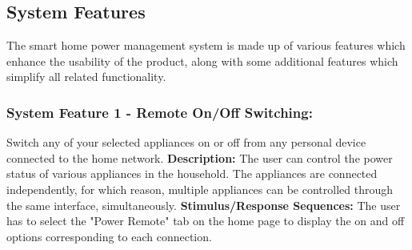 \documentclass[10pt,twocolumn]{witseiepaper}
\begin{document}
	\subsection{System Features}
	The smart home power management system is made up of various features which enhance the usability of the product, along with some additional features which simplify all related functionality.
	\subsubsection{System Feature 1 - Remote On/Off Switching: } 
	Switch any of your selected appliances on or off from any personal device connected to the home network. 
	\newline
	\textbf{Description:}
	The user can control the power status of various appliances in the household. The appliances are connected independently, for which reason, multiple appliances can be controlled through the same interface, simultaneously. 
	\newline
	\textbf{Stimulus/Response Sequences:}
	The user has to select the "Power Remote" tab on the home page to display the on and off options corresponding to each connection. 
	
\end{document}
